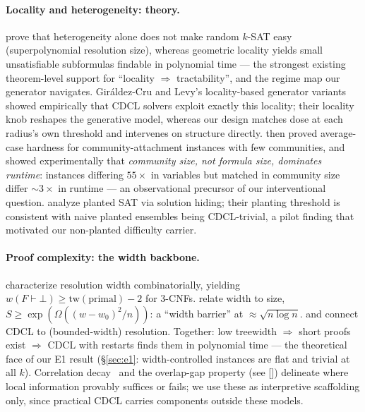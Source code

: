 \documentclass[pdflatex,sn-basic,Numbered]{sn-jnl}
\begin{document}
\paragraph{Locality and heterogeneity: theory.}
\citet{blasius2022} prove that heterogeneity alone does not
make random $k$-SAT easy (superpolynomial resolution size), whereas geometric
locality yields small unsatisfiable subformulas findable in polynomial time ---
the strongest existing theorem-level support for ``locality $\Rightarrow$
tractability'', and the regime map our generator navigates.
Gir\'aldez-Cru and Levy's locality-based generator
variants~\cite{giraldez2017} showed empirically that CDCL solvers exploit
exactly this locality; their locality knob reshapes the generative model,
whereas our design matches dose at each radius's own threshold and
intervenes on structure directly.
\citet{mull2016} then proved average-case hardness for
community-attachment instances with few communities, and showed
experimentally that \emph{community size, not formula size, dominates
runtime}: instances differing $55\times$ in variables but matched in community
size differ ${\sim}3\times$ in runtime --- an observational precursor of our
interventional question. \citet{jia2005} analyze planted
SAT via solution hiding; their planting threshold is consistent with naive planted
ensembles being CDCL-trivial, a pilot finding that motivated our non-planted
difficulty carrier.

\paragraph{Proof complexity: the width backbone.}
\citet{atserias2008} characterize resolution width
combinatorially, yielding $w(F\vdash\bot) \ge \mathrm{tw}(\text{primal}) - 2$
for 3-CNFs.
\citet{ben1999} relate width to size,
$S \ge \exp(\Omega((w-w_0)^2/n))$: a ``width barrier'' at
${\approx}\sqrt{n\log n}$. \citet{atserias2011} and
\citet{beame2003} connect CDCL to (bounded-width) resolution.
Together: low treewidth $\Rightarrow$ short proofs exist $\Rightarrow$
CDCL with restarts finds them in polynomial time --- the theoretical face of
our E1 result (\S\ref{sec:e1}: width-controlled instances are flat and
trivial at all $k$).
Correlation decay~\cite{weitz2006} and the overlap-gap property
(see [\citealp{gamarnik2021}]) delineate where local information provably suffices
or fails; we use these as interpretive scaffolding only, since practical CDCL
carries components outside these models.
\end{document}
